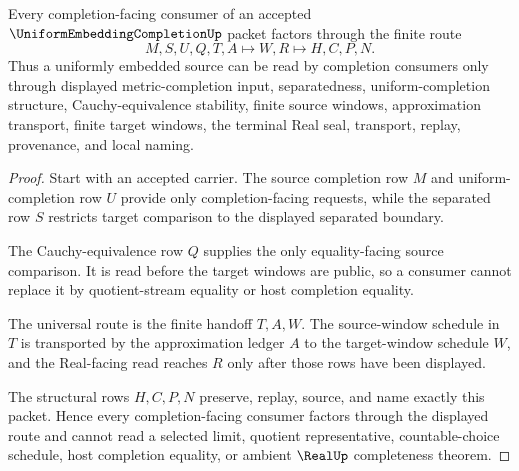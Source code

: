 \begin{theorem}
\label{thm:uniform-embedding-completion-universal-route}
Every completion-facing consumer of an accepted $\UniformEmbeddingCompletionUp$ packet factors through the finite route
$$
M,S,U,Q,T,A \longmapsto W,R \longmapsto H,C,P,N .
$$
Thus a uniformly embedded source can be read by completion consumers only through displayed metric-completion input, separatedness, uniform-completion structure, Cauchy-equivalence stability, finite source windows, approximation transport, finite target windows, the terminal Real seal, transport, replay, provenance, and local naming.
\end{theorem}
\begin{proof}
Start with an accepted carrier. The source completion row $M$ and uniform-completion row $U$ provide only completion-facing requests, while the separated row $S$ restricts target comparison to the displayed separated boundary.

The Cauchy-equivalence row $Q$ supplies the only equality-facing source comparison. It is read before the target windows are public, so a consumer cannot replace it by quotient-stream equality or host completion equality.

The universal route is the finite handoff $T,A,W$. The source-window schedule in $T$ is transported by the approximation ledger $A$ to the target-window schedule $W$, and the Real-facing read reaches $R$ only after those rows have been displayed.

The structural rows $H,C,P,N$ preserve, replay, source, and name exactly this packet. Hence every completion-facing consumer factors through the displayed route and cannot read a selected limit, quotient representative, countable-choice schedule, host completion equality, or ambient $\RealUp$ completeness theorem.
\end{proof}


